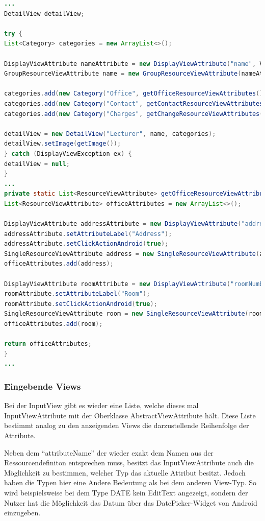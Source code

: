 \begin{lstlisting}[label=lst:detailview_impl,
language=java,
firstnumber=1,
caption=Erstellung einer DetailView]				   
...
DetailView detailView;

try {
List<Category> categories = new ArrayList<>();

DisplayViewAttribute nameAttribute = new DisplayViewAttribute("name", ViewAttribute.AttributeType.TEXT);
GroupResourceViewAttribute name = new GroupResourceViewAttribute(nameAttribute, getViewTitleAttributes());

categories.add(new Category("Office", getOfficeResourceViewAttributes()));
categories.add(new Category("Contact", getContactResourceViewAttributes()));
categories.add(new Category("Charges", getChangeResourceViewAttributes()));

detailView = new DetailView("Lecturer", name, categories);
detailView.setImage(getImage());
} catch (DisplayViewException ex) {
detailView = null;
}
...
private static List<ResourceViewAttribute> getOfficeResourceViewAttributes() {
List<ResourceViewAttribute> officeAttributes = new ArrayList<>();

DisplayViewAttribute addressAttribute = new DisplayViewAttribute("address", ViewAttribute.AttributeType.LOCATION);
addressAttribute.setAttributeLabel("Address");
addressAttribute.setClickActionAndroid(true);
SingleResourceViewAttribute address = new SingleResourceViewAttribute(addressAttribute);
officeAttributes.add(address);

DisplayViewAttribute roomAttribute = new DisplayViewAttribute("roomNumber", ViewAttribute.AttributeType.TEXT);
roomAttribute.setAttributeLabel("Room");
roomAttribute.setClickActionAndroid(true);
SingleResourceViewAttribute room = new SingleResourceViewAttribute(roomAttribute);
officeAttributes.add(room);

return officeAttributes;
}
...
\end{lstlisting}

\subsubsection{Eingebende Views}

Bei der InputView gibt es wieder eine Liste, welche dieses mal InputViewAttribute mit der Oberklasse AbstractViewAttribute hält. Diese Liste bestimmt analog zu den anzeigenden Views die darzustellende Reihenfolge der Attribute. 

Neben dem \enquote{attributeName} der wieder exakt dem Namen aus der Ressourcendefiniton entsprechen muss, besitzt das InputViewAttribute auch die Möglichkeit zu bestimmen, welcher Typ das aktuelle Attribut besitzt. Jedoch haben die Typen hier eine Andere Bedeutung als bei dem anderen View-Typ. So wird beispielsweise bei dem Type DATE kein EditText angezeigt, sondern der Nutzer hat die Möglichkeit das Datum über das DatePicker-Widget von Android einzugeben. 

